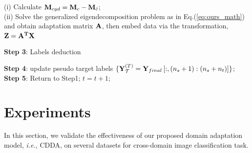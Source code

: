 \documentclass[10pt,twocolumn,letterpaper]{article}
\begin{document}
\begin{CJK*}{UTF8}{gkai}
\begin{algorithm}[!h]
{			(i) Calculate ${{\bf{M}}_{cyd}} = {{\bf{M}}_c} -{\bf M}_{\hat{c}} $;\\
			(ii) Solve the generalized eigendecomposition problem as in Eq.(\ref{eq:ours_math}) and obtain adaptation matrix $\bf A$, then  embed data via the transformation, $\bf{Z} = {{\bf{A}}^T}{\bf{X}}$\;
			
			\textbf{Step 3}: Labels deduction \\
		
		\textbf{Step  4}: update pseudo target labels $\{ {\bf{Y}}_{\cal T}^{(T)} = {{\bf{Y}}_{final}}\left[ {:,({n_s} + 1):({n_s} + {n_t})} \right]\} $;\\
		\textbf{Step  5}: Return to Step1;  $t=t+1$;\\               
	
}
\end{algorithm}


\section{Experiments}
In this section, we validate the effectiveness of our proposed  domain adaptation model, \textit{i.e.}, CDDA, on several datasets for cross-domain image classification task.

\end{CJK*}
\end{document}
